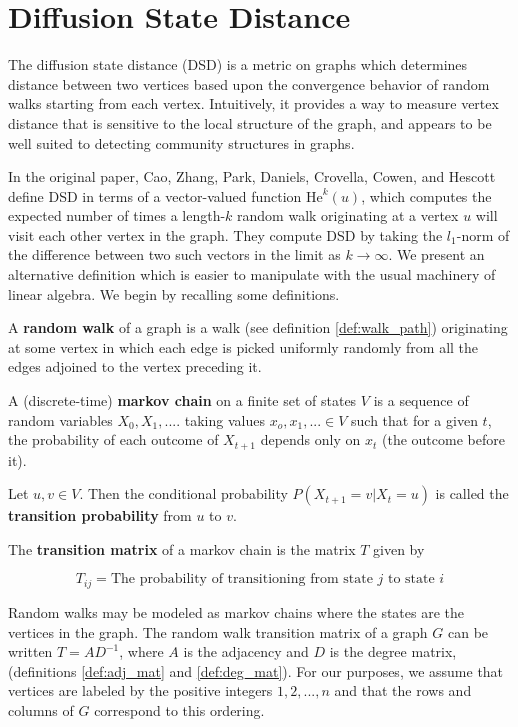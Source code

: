 \section{Diffusion State Distance}

The diffusion state distance (DSD) is a metric on graphs which determines distance between two
vertices based upon the convergence behavior of random walks starting from each vertex. Intuitively,
it provides a way to measure vertex distance that is sensitive to the local structure of the graph,
and appears to be well suited to detecting community structures in graphs.

In the original paper, Cao, Zhang, Park, Daniels, Crovella, Cowen, and Hescott define DSD in terms
of a vector-valued function $\mathrm{He}^{k}(u)$, which computes the expected number of times a
length-$k$ random walk originating at a vertex $u$ will visit each other vertex in the graph. They
compute DSD by taking the $l_1$-norm of the difference between two such vectors in the limit as
$k \to \infty$. We present an alternative definition which is easier to manipulate with the usual
machinery of linear algebra. We begin by recalling some definitions.

\begin{definition}
  A \textbf{random walk} of a graph is a walk (see definition \ref{def:walk_path}) originating at
  some vertex in which each edge is picked uniformly randomly from all the edges adjoined to the
  vertex preceding it.
\end{definition}

\begin{definition}
  A (discrete-time) \textbf{markov chain} on a finite set of states $V$ is a sequence of random
  variables $X_0,X_1,....$ taking values $x_o,x_1,... \in V$ such that for a given $t$, the
  probability of each outcome of $X_{t+1}$ depends only on $x_t$ (the outcome before it).

  Let $u,v \in V$. Then the conditional probability $P(X_{t+1}=v|X_t=u)$ is called the
  \textbf{transition probability} from $u$ to $v$.
  
  The \textbf{transition matrix} of a markov chain is the matrix $T$ given by

  \[
    T_{ij} = \text{The probability of transitioning from state $j$ to state $i$}
  \]
\end{definition}

Random walks may be modeled as markov chains where the states are the vertices in the graph. The
random walk transition matrix of a graph $G$ can be written $T = AD^{-1}$, where $A$ is the
adjacency and $D$ is the degree matrix, (definitions \ref{def:adj_mat} and \ref{def:deg_mat}). For
our purposes, we assume that vertices are labeled by the positive integers $1,2,...,n$ and that the
rows and columns of $G$ correspond to this ordering.


